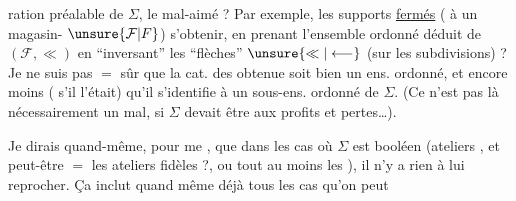%
%
ration préalable de $\Sigma$, le mal-aimé ? Par exemple, les supports  \uline{fermés} (  à un magasin- $\unsure{\mathcal{F}|F}$)  s'obtenir, en prenant l'ensemble ordonné déduit de $(\mathcal{F},\ll)$ en ``inversant'' les ``flèches'' $\unsure{\ll|\longleftarrow}$ (sur les subdivisions) ? Je ne suis pas $=$ sûr que la cat. des  obtenue soit bien un ens. ordonné, et encore moins ( s'il l'était) qu'il  s'identifie à un sous-ens. ordonné de $\Sigma$. (Ce n'est pas là nécessairement un mal, si $\Sigma$ devait être  aux profits et pertes\ldots).

Je dirais quand-même, pour me , que dans les cas où $\Sigma$ est booléen (ateliers , et peut-être $=$ les ateliers fidèles ?, ou tout au moins  les ), il n'y a rien à lui reprocher. Ça inclut quand même déjà tous les cas qu'on peut
